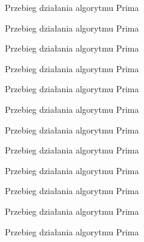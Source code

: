 \documentclass[a4paper,10pt]{beamer}
\begin{document}
		\begin{frame}{Przebieg działania algorytmu Prima}
		\end{frame}	
		\begin{frame}{Przebieg działania algorytmu Prima}
		\end{frame}	
		\begin{frame}{Przebieg działania algorytmu Prima}
		\end{frame}	
		\begin{frame}{Przebieg działania algorytmu Prima}
		\end{frame}	
		\begin{frame}{Przebieg działania algorytmu Prima}
		\end{frame}	
		\begin{frame}{Przebieg działania algorytmu Prima}
		\end{frame}	
		\begin{frame}{Przebieg działania algorytmu Prima}
		\end{frame}	
		\begin{frame}{Przebieg działania algorytmu Prima}
		\end{frame}	
		\begin{frame}{Przebieg działania algorytmu Prima}
		\end{frame}	
		\begin{frame}{Przebieg działania algorytmu Prima}
		\end{frame}	
		\begin{frame}{Przebieg działania algorytmu Prima}
		\end{frame}	
		\begin{frame}{Przebieg działania algorytmu Prima}
		\end{frame}
\end{document}
